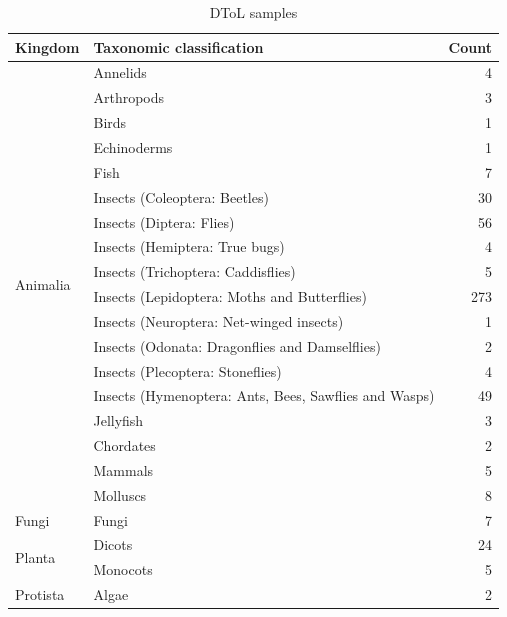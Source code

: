 \begin{table}[ht!]
\caption{DToL samples}
\label{tab:dtol-samples}
\begin{adjustbox}{max width=1.1\textwidth,center}
\begin{tabular}{l|l|r}
Kingdom & Taxonomic classification & Count \\ \hline
\multirow{18}{*}{Animalia}  & Annelids & 4  \\ \cline{2-3}
& Arthropods & 3  \\ \cline{2-3}
& Birds & 1  \\ \cline{2-3}
& Echinoderms & 1  \\ \cline{2-3}
& Fish & 7  \\ \cline{2-3}
& Insects (Coleoptera: Beetles)  & 30  \\ \cline{2-3}
& Insects (Diptera: Flies) & 56  \\ \cline{2-3}
& Insects (Hemiptera: True bugs) & 4  \\ \cline{2-3}
& Insects (Trichoptera: Caddisflies) & 5  \\ \cline{2-3}
& Insects (Lepidoptera: Moths and Butterflies) & 273  \\ \cline{2-3}
& Insects (Neuroptera: Net-winged insects) & 1  \\ \cline{2-3}
& Insects (Odonata: Dragonflies and Damselflies) & 2 \\ \cline{2-3}
& Insects (Plecoptera: Stoneflies) & 4  \\ \cline{2-3}
& Insects (Hymenoptera: Ants, Bees, Sawflies and Wasps) & 49  \\ \cline{2-3}
& Jellyfish & 3  \\ \cline{2-3}
& Chordates & 2  \\ \cline{2-3}
& Mammals & 5  \\ \cline{2-3}
& Molluscs & 8  \\ \hline
Fungi & Fungi & 7 \\ \hline
\multirow{2}{*}{Planta} & Dicots & 24  \\ \cline{2-3}
 & Monocots & 5 \\ \hline
Protista & Algae & 2 \\ \hline
\end{tabular}
\end{adjustbox}
\end{table}

\pagebreak

